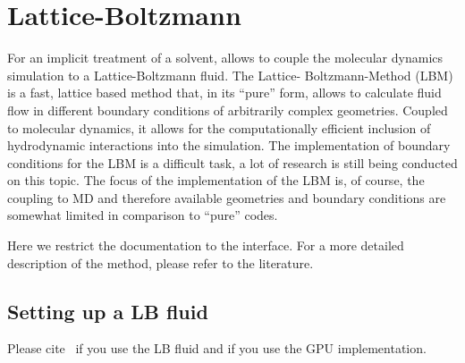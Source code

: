 %  
%   
%  
%  
%

\chapter{Lattice-Boltzmann}
\label{sec:lb}

For an implicit treatment of a solvent, \es allows to couple the
molecular dynamics simulation to a Lattice-Boltzmann fluid. The Lattice-
Boltzmann-Method (LBM) is a fast, lattice based method that, in its
``pure'' form, allows to calculate fluid flow in different boundary conditions
of arbitrarily complex geometries. Coupled to molecular dynamics, it allows for 
the computationally efficient inclusion of hydrodynamic interactions into the 
simulation. The implementation of boundary conditions for the LBM is a difficult
 task, a lot of research is still being conducted on this topic. The focus of 
the \es implementation of the LBM is, of course, the coupling to MD and 
therefore available geometries and boundary conditions are somewhat limited 
in comparison to ``pure'' codes. 

Here we restrict the documentation to the interface. For a more detailed
description of the method, please refer to the literature.

\section{Setting up a LB fluid}

\begin{citebox}
  Please cite~ if you use the LB fluid and
   if you use the GPU implementation.
\end{citebox}


